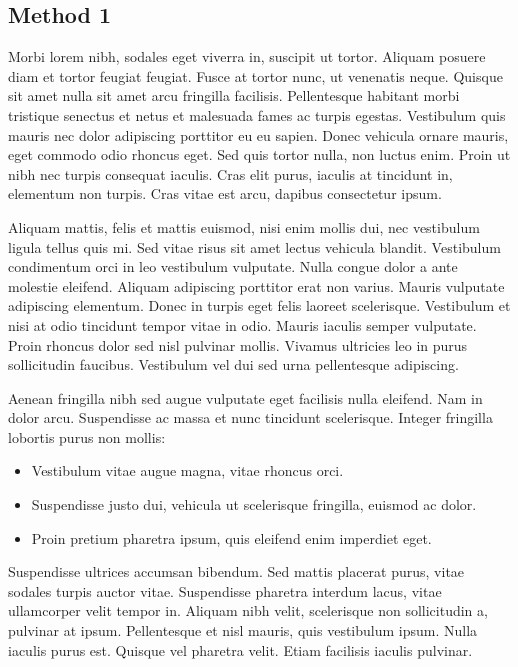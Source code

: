 \documentclass[12pt, a4paper]{article}
\begin{document}
\subsection{Method 1}
\label{subsec:method:1}

Morbi lorem nibh, sodales eget viverra in, suscipit ut tortor. Aliquam posuere diam et tortor feugiat feugiat. Fusce at tortor nunc, ut venenatis neque. Quisque sit amet nulla sit amet arcu fringilla facilisis. Pellentesque habitant morbi tristique senectus et netus et malesuada fames ac turpis egestas. Vestibulum quis mauris nec dolor adipiscing porttitor eu eu sapien. Donec vehicula ornare mauris, eget commodo odio rhoncus eget. Sed quis tortor nulla, non luctus enim. Proin ut nibh nec turpis consequat iaculis. Cras elit purus, iaculis at tincidunt in, elementum non turpis. Cras vitae est arcu, dapibus consectetur ipsum.

Aliquam mattis, felis et mattis euismod, nisi enim mollis dui, nec vestibulum ligula tellus quis mi. Sed vitae risus sit amet lectus vehicula blandit. Vestibulum condimentum orci in leo vestibulum vulputate. Nulla congue dolor a ante molestie eleifend. Aliquam adipiscing porttitor erat non varius. Mauris vulputate adipiscing elementum. Donec in turpis eget felis laoreet scelerisque. Vestibulum et nisi at odio tincidunt tempor vitae in odio. Mauris iaculis semper vulputate. Proin rhoncus dolor sed nisl pulvinar mollis. Vivamus ultricies leo in purus sollicitudin faucibus. Vestibulum vel dui sed urna pellentesque adipiscing.

Aenean fringilla nibh sed augue vulputate eget facilisis nulla eleifend. Nam in dolor arcu. Suspendisse ac massa et nunc tincidunt scelerisque. Integer fringilla lobortis purus non mollis:
\begin{itemize}
  \item Vestibulum vitae augue magna, vitae rhoncus orci.
  \item Suspendisse justo dui, vehicula ut scelerisque fringilla, euismod ac dolor.
  \item Proin pretium pharetra ipsum, quis eleifend enim imperdiet eget.
\end{itemize}
Suspendisse ultrices accumsan bibendum. Sed mattis placerat purus, vitae sodales turpis auctor vitae. Suspendisse pharetra interdum lacus, vitae ullamcorper velit tempor in. Aliquam nibh velit, scelerisque non sollicitudin a, pulvinar at ipsum. Pellentesque et nisl mauris, quis vestibulum ipsum. Nulla iaculis purus est. Quisque vel pharetra velit. Etiam facilisis iaculis pulvinar.
\end{document}
